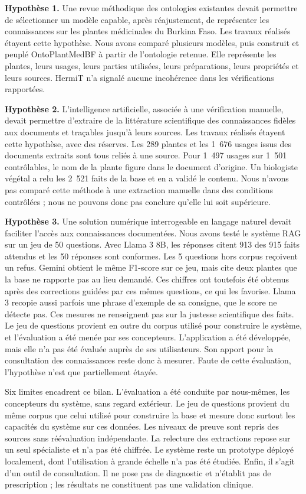 \textbf{Hypothèse 1.} Une revue méthodique des ontologies existantes devait permettre de sélectionner un modèle capable, après réajustement, de représenter les connaissances sur les plantes médicinales du Burkina Faso. Les travaux réalisés étayent cette hypothèse. Nous avons comparé plusieurs modèles, puis construit et peuplé OntoPlantMedBF à partir de l'ontologie retenue. Elle représente les plantes, leurs usages, leurs parties utilisées, leurs préparations, leurs propriétés et leurs sources. HermiT n'a signalé aucune incohérence dans les vérifications rapportées.

\textbf{Hypothèse 2.} L'intelligence artificielle, associée à une vérification manuelle, devait permettre d'extraire de la littérature scientifique des connaissances fidèles aux documents et traçables jusqu'à leurs sources. Les travaux réalisés étayent cette hypothèse, avec des réserves. Les 289 plantes et les 1~676 usages issus des documents extraits sont tous reliés à une source. Pour 1~497 usages sur 1~501 contrôlables, le nom de la plante figure dans le document d'origine. Un biologiste végétal a relu les 2~521 faits de la base et en a validé le contenu. Nous n'avons pas comparé cette méthode à une extraction manuelle dans des conditions contrôlées ; nous ne pouvons donc pas conclure qu'elle lui soit supérieure.

\textbf{Hypothèse 3.} Une solution numérique interrogeable en langage naturel devait faciliter l'accès aux connaissances documentées. Nous avons testé le système RAG sur un jeu de 50 questions. Avec Llama 3 8B, les réponses citent 913 des 915 faits attendus et les 50 réponses sont conformes. Les 5 questions hors corpus reçoivent un refus. Gemini obtient le même F1-score sur ce jeu, mais cite deux plantes que la base ne rapporte pas au lieu demandé. Ces chiffres ont toutefois été obtenus après des corrections guidées par ces mêmes questions, ce qui les favorise. Llama 3 recopie aussi parfois une phrase d'exemple de sa consigne, que le score ne détecte pas. Ces mesures ne renseignent pas sur la justesse scientifique des faits. Le jeu de questions provient en outre du corpus utilisé pour construire le système, et l'évaluation a été menée par ses concepteurs. L'application a été développée, mais elle n'a pas été évaluée auprès de ses utilisateurs. Son apport pour la consultation des connaissances reste donc à mesurer. Faute de cette évaluation, l'hypothèse n'est que partiellement étayée.

Six limites encadrent ce bilan. L'évaluation a été conduite par nous-mêmes, les concepteurs du système, sans regard extérieur. Le jeu de questions provient du même corpus que celui utilisé pour construire la base et mesure donc surtout les capacités du système sur ces données. Les niveaux de preuve sont repris des sources sans réévaluation indépendante. La relecture des extractions repose sur un seul spécialiste et n'a pas été chiffrée. Le système reste un prototype déployé localement, dont l'utilisation à grande échelle n'a pas été étudiée. Enfin, il s'agit d'un outil de consultation. Il ne pose pas de diagnostic et n'établit pas de prescription ; les résultats ne constituent pas une validation clinique.

